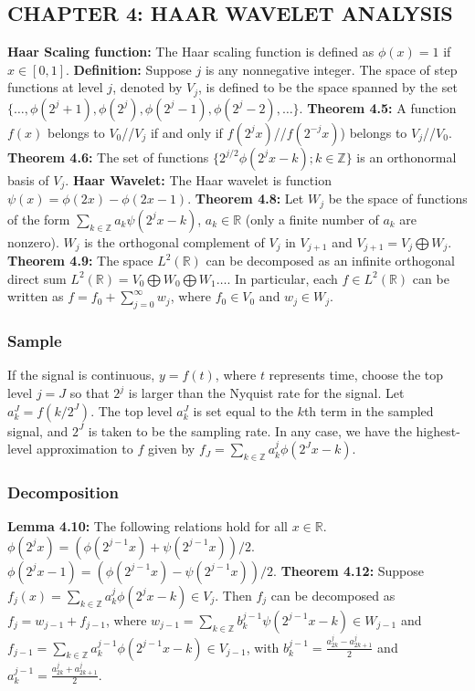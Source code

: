 \documentclass[a4paper]{article}
\newcommand{\R}{\mathbb{R}}
\newcommand{\Z}{\mathbb{Z}}
\begin{document}
\begin{multicols}{2}
\section*{CHAPTER 4: HAAR WAVELET ANALYSIS}
{\bf Haar Scaling function:} The Haar scaling function is defined as $\phi(x) = 1$ if $x\in[0,1]$.
{\bf Definition:} Suppose $j$ is any nonnegative integer. The space of step functions at level $j$, denoted by $V_j$, is defined to be the space spanned by the set $\{\dots,\phi(2^j+1),\phi(2^j),\phi(2^j-1),\phi(2^j-2),\dots\}$.
{\bf Theorem 4.5:} A function $f(x)$ belongs to $V_0$//$V_j$ if and only if $f(2^jx)$//$f(2^{-j}x)$) belongs to $V_j$//$V_0$.
{\bf Theorem 4.6:} The set of functions $\{2^{j/2}\phi(2^jx-k);k\in\Z\}$ is an orthonormal basis of $V_j$.
{\bf Haar Wavelet:} The Haar wavelet is function $\psi(x) = \phi(2x)-\phi(2x-1)$.
{\bf Theorem 4.8:} Let $W_j$ be the space of functions of the form $\sum_{k\in\Z}a_k\psi(2^jx-k)$, $a_k\in\R$ (only a finite number of $a_k$ are nonzero). $W_j$ is the orthogonal complement of $V_j$ in $V_{j+1}$ and $V_{j+1}=V_j\bigoplus W_j$.
{\bf Theorem 4.9:} The space $L^2(\R)$ can be decomposed as an infinite orthogonal direct sum $L^2(\R)=V_0\bigoplus W_0\bigoplus W_1\dots$. In particular, each $f\in L^2(\R)$ can be written as $f=f_0+\sum_{j=0}^{\infty}w_j$, where $f_0\in V_0$ and $w_j\in W_j$.
\subsubsection*{Sample}
If the signal is continuous, $y=f(t)$, where $t$ represents time, choose the top level $j=J$ so that $2^j$ is larger than the Nyquist rate for the signal. Let $a_k^J=f(k/2^J)$. The top level $a_k^J$ is set equal to the $k$th term in the sampled signal, and $2^J$ is taken to be the sampling rate. In any case, we have the highest-level approximation to $f$ given by $f_J=\sum_{k\in\Z}a_k^j\phi(2^Jx-k)$.
\subsubsection*{Decomposition}
{\bf Lemma 4.10:} The following relations hold for all $x\in\R$. $\phi(2^jx)=\left(\phi(2^{j-1}x)+\psi(2^{j-1}x)\right)/2$. $\phi(2^jx-1)=\left(\phi(2^{j-1}x)-\psi(2^{j-1}x)\right)/2$.
{\bf Theorem 4.12:} Suppose $f_j(x)=\sum_{k\in\Z}a_k^j\phi(2^jx-k)\in V_j$. Then $f_j$ can be decomposed as $f_j=w_{j-1}+f_{j-1}$, where $w_{j-1}=\sum_{k\in\Z}b_k^{j-1}\psi(2^{j-1}x-k)\in W_{j-1}$ and $f_{j-1}=\sum_{k\in\Z}a_k^{j-1}\phi(2^{j-1}x-k)\in V_{j-1}$, with $b_k^{j-1}=\frac{a_{2k}^j-a_{2k+1}^j}{2}$ and $a_k^{j-1}=\frac{a_{2k}^j+a_{2k+1}^j}{2}$.

\end{multicols}
\end{document}
